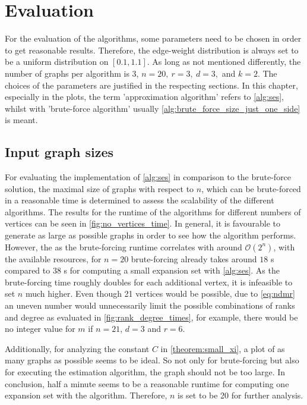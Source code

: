 \chapter{Evaluation}\label{chapter:Evaluation}
For the evaluation of the algorithms, some parameters need to be chosen in order to get reasonable results. Therefore, the edge-weight distribution is always set to be a uniform distribution on $[0.1, 1.1]$. As long as not mentioned differently, the number of graphs per algorithm is 3, $n = 20,\  r = 3, \  d = 3, $ and $ k = 2$. The choices of the parameters are justified in the respecting sections. In this chapter, especially in the plots, the term 'approximation algorithm' refers to \cref{alg:ses}, whilst with 'brute-force algorithm' usually \cref{alg:brute_force_size_just_one_side} is meant.



\section{Input graph sizes}
For evaluating the implementation of \cref{alg:ses} in comparison to the brute-force solution, the maximal size of graphs with respect to $n$, which can be brute-forced in a reasonable time is determined to assess the scalability of the different algorithms. The results for the runtime of the algorithms for different numbers of vertices can be seen in \cref{fig:no_vertices_time}. In general, it is favourable to generate as large as possible graphs in order to see how the algorithm performs.
However, the as the brute-forcing runtime correlates with around $ \mathcal{O}(2^n)$, with the available resources, for $n=20$ brute-forcing already takes around $18$ s compared to $38$ s for computing a small expansion set with \cref{alg:ses}. As the brute-forcing time roughly doubles for each additional vertex, it is infeasible to set $n$ much higher. Even though 21 vertices would be possible, due to \cref{eq:ndmr} an uneven number would unnecessarily limit the possible combinations of ranks and degree as evaluated in \cref{fig:rank_degree_times}, for example, there would be no integer value for $m$ if $n = 21$, $d= 3$ and $r = 6$.

Additionally, for analyzing the constant $C$ in \cref{theorem:small_xi}, a plot of as many graphs as possible seems to be ideal. So not only for brute-forcing but also for executing the estimation algorithm, the graph should not be too large. In conclusion, half a minute seems to be a reasonable runtime for computing one expansion set with the algorithm. %
Therefore, $n$ is set to be 20 for further analysis.

